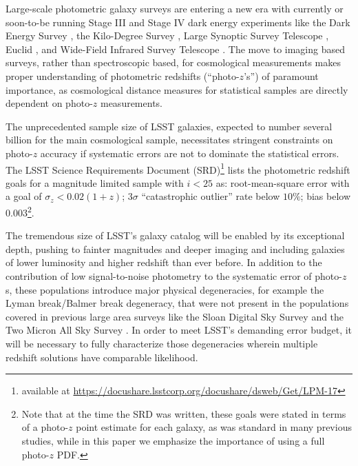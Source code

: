 \documentclass[usenatbib]{mn2e}
\newcommand{\red}[1]{\textcolor{red}{#1}}
\newcommand{\jan}[1]{\textcolor{orange}{#1}}%
\begin{document}


Large-scale photometric galaxy surveys are entering a new era with currently or soon-to-be running Stage III and Stage IV dark energy experiments like the Dark Energy Survey \citep[DES,][]{Abbott:05}, the Kilo-Degree Survey \citep[KiDS,][]{de_Jong:13}, Large Synoptic Survey Telescope \citep[LSST,][]{Abell:09}, Euclid \citep{Laureijs:11}, and Wide-Field Infrared Survey Telescope \citep[WFIRST,][]{Green:12}. 
The move to imaging based surveys, rather than spectroscopic based, for cosmological measurements makes proper understanding of photometric redshifts (``photo-$z$'s'') of paramount importance, as cosmological distance measures for statistical samples are directly dependent on photo-$z$ measurements.  

The unprecedented sample size of LSST galaxies, expected to number several billion for the main cosmological sample, necessitates stringent constraints on photo-$z$ accuracy if systematic errors are not to dominate the statistical errors. 
The LSST Science Requirements Document (SRD)\footnote{available at \url{https://docushare.lsstcorp.org/docushare/dsweb/Get/LPM-17}} lists the photometric redshift goals for a magnitude limited sample with $i<25$ as: root-mean-square error with a goal of $\sigma_z<0.02(1+z)$; $3\sigma$ ``catastrophic outlier'' rate below $10\%$; bias below $0.003$\footnote{ 
Note that at the time the SRD was written, these goals were stated in terms of a photo-$z$ point estimate for each galaxy, as was standard in many previous studies, while in this paper we emphasize the importance of using a full photo-$z$ PDF.}.  

The tremendous size of LSST's galaxy catalog will be enabled by its exceptional depth, pushing to fainter magnitudes and deeper imaging and including galaxies of lower luminosity and higher redshift than ever before. 
In addition to the contribution of low signal-to-noise photometry to the systematic error of photo-$z$s, these populations introduce major physical degeneracies, for example the Lyman break/Balmer break degeneracy, that were not present in the populations covered in previous large area surveys like the Sloan Digital Sky Survey \citep[SDSS,][]{York:00} and the Two Micron All Sky Survey \citep[2MASS,][]{Skrutskie:06}.  In order to meet LSST's demanding error budget, it will be necessary to fully characterize those degeneracies wherein multiple redshift solutions have comparable likelihood. 
\end{document}
